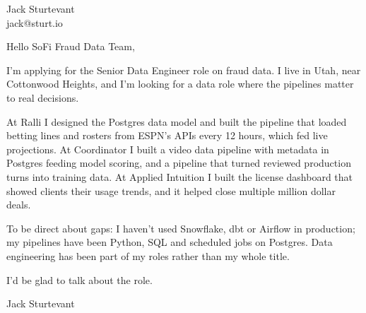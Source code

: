 \documentclass[11pt]{article}
\begin{document}
\raggedright

{\namefont\fontsize{20pt}{24pt}\selectfont Jack Sturtevant}\\[-0.3em]
jack@sturt.io

\vspace{1.2em}

Hello SoFi Fraud Data Team,

I'm applying for the Senior Data Engineer role on fraud data. I live in Utah, near Cottonwood Heights, and I'm looking for a data role where the pipelines matter to real decisions.

At Ralli I designed the Postgres data model and built the pipeline that loaded betting lines and rosters from ESPN's APIs every 12 hours, which fed live projections. At Coordinator I built a video data pipeline with metadata in Postgres feeding model scoring, and a pipeline that turned reviewed production turns into training data. At Applied Intuition I built the license dashboard that showed clients their usage trends, and it helped close multiple million dollar deals.

To be direct about gaps: I haven't used Snowflake, dbt or Airflow in production; my pipelines have been Python, SQL and scheduled jobs on Postgres. Data engineering has been part of my roles rather than my whole title.

I'd be glad to talk about the role.

\vspace{0.6em}
Jack Sturtevant
\end{document}
